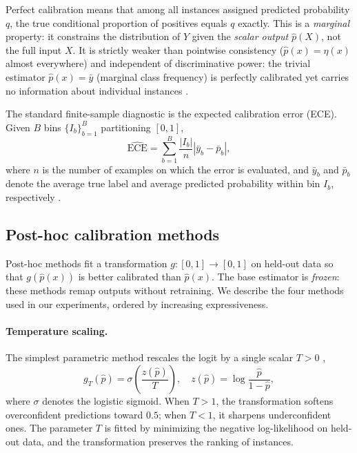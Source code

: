 Perfect calibration means that among all instances assigned predicted probability $q$, the true conditional proportion of positives equals $q$ exactly. This is a \textit{marginal} property: it constrains the distribution of $Y$ given the \textit{scalar output} $\hat{p}(X)$, not the full input $X$. It is strictly weaker than pointwise consistency ($\hat{p}(x) = \eta(x)$ almost everywhere) and independent of discriminative power: the trivial estimator $\hat{p}(x) = \bar{y}$ (marginal class frequency) is perfectly calibrated yet carries no information about individual instances \citep{degroot1983comparison}.

The standard finite-sample diagnostic is the expected calibration error (ECE). Given $B$ bins $\{I_b\}_{b=1}^B$ partitioning $[0,1]$,
\begin{equation}\label{eq:ece}
    \widehat{\mathrm{ECE}} = \sum_{b=1}^{B} \frac{|I_b|}{n} \left| \bar{y}_b - \bar{p}_b \right|,
\end{equation}
where $n$ is the number of examples on which the error is evaluated, and $\bar{y}_b$ and $\bar{p}_b$ denote the average true label and average predicted probability within bin $I_b$, respectively \citep{naeini2015obtaining}.

\subsection{Post-hoc calibration methods}

Post-hoc methods fit a transformation $g: [0,1] \to [0,1]$ on held-out data so that $g(\hat{p}(x))$ is better calibrated than $\hat{p}(x)$. The base estimator is \textit{frozen}: these methods remap outputs without retraining. We describe the four methods used in our experiments, ordered by increasing expressiveness.

\paragraph{Temperature scaling.} The simplest parametric method rescales the logit by a single scalar $T > 0$ \citep{guo2017calibration},
\begin{equation}\label{eq:temperature_scaling}
    g_T(\hat{p}) = \sigma\!\left(\frac{z(\hat{p})}{T}\right), \quad z(\hat{p}) = \log \frac{\hat{p}}{1 - \hat{p}},
\end{equation}
where $\sigma$ denotes the logistic sigmoid. When $T > 1$, the transformation softens overconfident predictions toward $0.5$; when $T < 1$, it sharpens underconfident ones. The parameter $T$ is fitted by minimizing the negative log-likelihood on held-out data, and the transformation preserves the ranking of instances.

